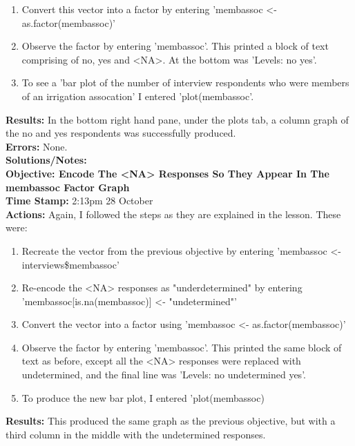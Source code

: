 \documentclass{article}
\begin{document}
\begin{FlushLeft}
\begin{enumerate}
    \item Convert this vector into a factor by entering 'memb\textunderscore assoc <- as.factor(memb\textunderscore assoc)'
    \item Observe the factor by entering 'memb\textunderscore assoc'. This printed a block of text comprising of no, yes and \textless NA\textgreater{}. At the bottom was 'Levels: no yes'.
    \item To see a 'bar plot of the number of interview respondents who were members of an irrigation assocation' I entered 'plot(memb\textunderscore assoc'.
\end{enumerate}
\textbf{Results:} In the bottom right hand pane, under the plots tab, a column graph of the no and yes respondents was successfully produced.\\
\textbf{Errors:} None.\\
\textbf{Solutions/Notes:}\\
\vspace{5mm}
\textbf{Objective: Encode The \textless NA\textgreater{} Responses So They Appear In The memb\textunderscore assoc Factor Graph}\\ 
\textbf{Time Stamp:} 2:13pm 28 October\\
\textbf{Actions:} Again, I followed the steps as they are explained in the lesson. These were:
\begin{enumerate}
    \item Recreate the vector from the previous objective by entering 'memb\textunderscore assoc \textless - interviews\$memb\textunderscore assoc'
    \item Re-encode the \textless NA\textgreater{} responses as "underdetermined" by entering 'memb\textunderscore assoc[is.na(memb\textunderscore assoc)] <- "undetermined"'
    \item Convert the vector into a factor using 'memb\textunderscore assoc \textless - as.factor(memb\textunderscore assoc)'
    \item Observe the factor by entering 'memb\textunderscore assoc'. This printed the same block of text as before, except all the \textless NA\textgreater{} responses were replaced with undetermined, and the final line was 'Levels: no undetermined yes'.
    \item To produce the new bar plot, I entered 'plot(memb\textunderscore assoc)
\end{enumerate}
\textbf{Results:} This produced the same graph as the previous objective, but with a third column in the middle with the undetermined responses.\\

\end{FlushLeft}
\end{document}
